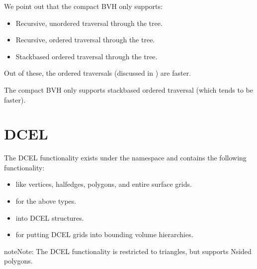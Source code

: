 \documentclass[letterpaper,10pt,english]{sphinxmanual}
\begin{document}
\sphinxAtStartPar
We point out that the compact BVH only supports:
\begin{itemize}
\item {} 
\sphinxAtStartPar
Recursive, unordered traversal through the tree.

\item {} 
\sphinxAtStartPar
Recursive, ordered traversal through the tree.

\item {} 
\sphinxAtStartPar
Stack\sphinxhyphen{}based ordered traversal through the tree.

\end{itemize}

\sphinxAtStartPar
Out of these, the ordered traversals (discussed in {\hyperref[\detokenize{BVH:chap-bvh}]{}}) are faster.

\sphinxAtStartPar
The compact BVH only supports stack\sphinxhyphen{}based ordered traversal (which tends to be faster).

\sphinxstepscope


\section{DCEL}
\label{\detokenize{ImplemDCEL:dcel}}\label{\detokenize{ImplemDCEL:chap-implemdcel}}\label{\detokenize{ImplemDCEL::doc}}
\sphinxAtStartPar
The DCEL functionality exists under the namespace  and contains the following functionality:
\begin{itemize}
\item {} 
\sphinxAtStartPar
{} like vertices, half\sphinxhyphen{}edges, polygons, and entire surface grids.

\item {} 
\sphinxAtStartPar
{} for the above types.

\item {} 
\sphinxAtStartPar
{} into DCEL structures.

\item {} 
\sphinxAtStartPar
{} for putting DCEL grids into bounding volume hierarchies.

\end{itemize}

\begin{sphinxadmonition}{note}{Note:}
\sphinxAtStartPar
The DCEL functionality is  restricted to triangles, but supports N\sphinxhyphen{}sided polygons.
\end{sphinxadmonition}
\end{document}
